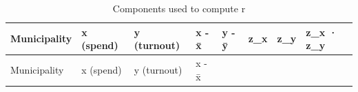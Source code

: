\documentclass[
  letterpaper,
  DIV=11,
  numbers=noendperiod]{scrreprt}
\begin{document}
\begin{longtable}[]{@{}
  >{\raggedright\arraybackslash}p{}
  >{\raggedleft\arraybackslash}p{}
  >{\raggedleft\arraybackslash}p{}
  >{\raggedleft\arraybackslash}p{}
  >{\raggedleft\arraybackslash}p{}
  >{\raggedleft\arraybackslash}p{}
  >{\raggedleft\arraybackslash}p{}
  >{\raggedleft\arraybackslash}p{}@{}}
\caption{Components used to compute r}\tabularnewline
\toprule\noalign{}
\begin{minipage}[b]{\linewidth}\raggedright
Municipality
\end{minipage} & \begin{minipage}[b]{\linewidth}\raggedleft
x (spend)
\end{minipage} & \begin{minipage}[b]{\linewidth}\raggedleft
y (turnout)
\end{minipage} & \begin{minipage}[b]{\linewidth}\raggedleft
x - x̄
\end{minipage} & \begin{minipage}[b]{\linewidth}\raggedleft
y - ȳ
\end{minipage} & \begin{minipage}[b]{\linewidth}\raggedleft
z\_x
\end{minipage} & \begin{minipage}[b]{\linewidth}\raggedleft
z\_y
\end{minipage} & \begin{minipage}[b]{\linewidth}\raggedleft
z\_x · z\_y
\end{minipage} \\
\midrule\noalign{}
\endfirsthead
\toprule\noalign{}
\begin{minipage}[b]{\linewidth}\raggedright
Municipality
\end{minipage} & \begin{minipage}[b]{\linewidth}\raggedleft
x (spend)
\end{minipage} & \begin{minipage}[b]{\linewidth}\raggedleft
y (turnout)
\end{minipage} & \begin{minipage}[b]{\linewidth}\raggedleft
x - x̄
\end{minipage} & \begin{minipage}[b]{\linewidth}\raggedleft

\end{minipage}
\end{longtable}
\end{document}
